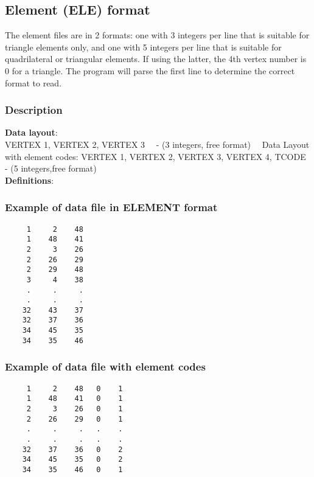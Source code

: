 \documentclass{article}
\begin{document}
\newpage
\subsection[Element (ELE) format]{Element (ELE) format}

The element files are in 2 formats: one with 3 integers per line that is suitable for
triangle elements only, and one with 5 integers per line that is suitable for 
quadrilateral or triangular elements. If using the latter, the 4th vertex number
is 0 for a triangle. The program will parse the first line
to determine the correct format to read.

\subsubsection[Description]{Description}

\textbf{Data layout}: \\ 

\noindent
VERTEX 1, VERTEX 2, VERTEX 3 \ \ {}- (3 integers, free format)\newline
\ \ Data Layout with element codes:\newline
VERTEX 1, VERTEX 2, VERTEX 3, VERTEX 4, TCODE - (5 integers,free format) \\

\noindent\textbf{Definitions}:\\ 

\noindent

\subsubsection{Example of data file in ELEMENT format}
\begin{small}
\begin{lstlisting}
     1     2    48
     1    48    41
     2     3    26
     2    26    29
     2    29    48
     3     4    38
     .     .     .
     .     .     .
    32    43    37
    32    37    36
    34    45    35
    34    35    46
\end{lstlisting}
\end{small}


\subsubsection{Example of data file with element codes}
\begin{small}
\begin{lstlisting}
     1     2    48   0    1
     1    48    41   0    1
     2     3    26   0    1
     2    26    29   0    1
     .     .     .   .    .
     .     .     .   .    .
    32    37    36   0    2
    34    45    35   0    2
    34    35    46   0    1
\end{lstlisting}
\end{small}
\end{document}
